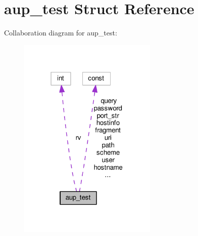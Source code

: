 \hypertarget{structaup__test}{}\section{aup\+\_\+test Struct Reference}
\label{structaup__test}


Collaboration diagram for aup\+\_\+test\+:
\nopagebreak
\begin{figure}[H]
\begin{center}
\leavevmode
\includegraphics[width=187pt]{structaup__test__coll__graph}
\end{center}
\end{figure}

